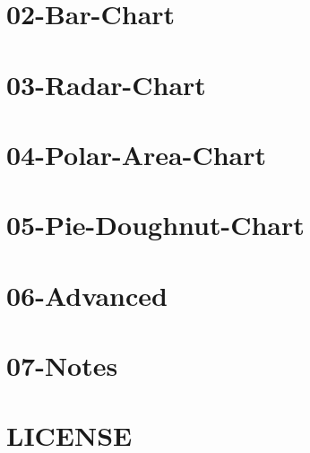 \documentclass[twoside]{book}
\newcommand{\+}{\discretionary{\mbox{\scriptsize$\hookleftarrow$}}{}{}}
\begin{document}
\chapter{02-\/\+Bar-\/\+Chart}
\label{md_app_web_bower_components_chartjs_docs_02-_bar-_chart}

\chapter{03-\/\+Radar-\/\+Chart}
\label{md_app_web_bower_components_chartjs_docs_03-_radar-_chart}

\chapter{04-\/\+Polar-\/\+Area-\/\+Chart}
\label{md_app_web_bower_components_chartjs_docs_04-_polar-_area-_chart}

\chapter{05-\/\+Pie-\/\+Doughnut-\/\+Chart}
\label{md_app_web_bower_components_chartjs_docs_05-_pie-_doughnut-_chart}

\chapter{06-\/\+Advanced}
\label{md_app_web_bower_components_chartjs_docs_06-_advanced}

\chapter{07-\/\+Notes}
\label{md_app_web_bower_components_chartjs_docs_07-_notes}

\chapter{L\+I\+C\+E\+N\+SE}
\label{md_app_web_bower_components_chartjs__l_i_c_e_n_s_e}

\end{document}

